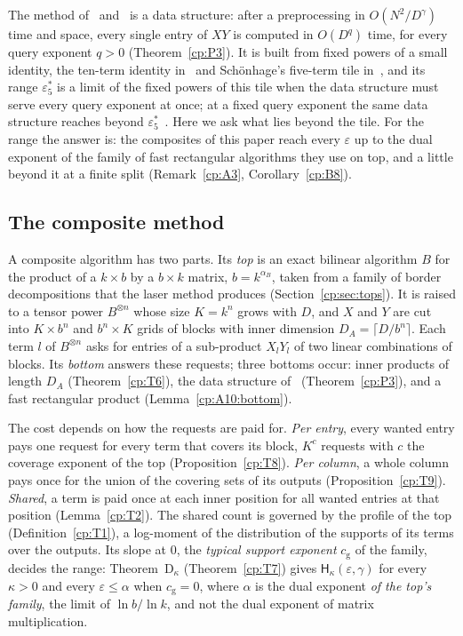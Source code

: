 \documentclass[11pt]{article}
\makeatletter
\theoremstyle{definition}
\theoremstyle{remark}
\DeclareRobustCommand{\CPTODO}[1]{{\color{red}\textbf{[CP-TODO:} #1\textbf{]}}}
\providecommand{\eps}{\varepsilon}
\newcommand{\Hypk}[1]{\mathsf{H}_{#1}}        %
\newcommand{\es}{\varepsilon^*_5}             %
\newcommand{\alB}{\alpha_B}                   %
\newcommand{\cg}{c_{\mathrm g}}               %
\newcommand{\ThmDk}{Theorem~D\texorpdfstring{\ensuremath{_\kappa}}{\_kappa}}     %
\newcommand{\Vref}[1]{\ifcsname vtworef@#1\endcsname\csname vtworef@#1\endcsname\else\CPTODO{label #1 of the other paper undefined}\fi}
\makeatother
\begin{document}
The method of~\cite{AV26} and~\cite{v2} is a data structure: after a preprocessing in $O(N^2/D^{\gamma})$ time and space, every single entry of $XY$ is computed in $O(D^q)$ time, for every query exponent $q>0$ (Theorem~\ref{cp:P3}). It is built from fixed powers of a small identity, the ten-term identity in~\cite{AV26} and Schönhage's five-term tile in~\cite{v2}, and its range $\es$ is a limit of the fixed powers of this tile when the data structure must serve every query exponent at once; at a fixed query exponent the same data structure reaches beyond $\es$~\cite[Theorem~\Vref{m:thm:fixedq}]{v2}. Here we ask what lies beyond the tile. For the range the answer is: the composites of this paper reach every $\eps$ up to the dual exponent of the family of fast rectangular algorithms they use on top, and a little beyond it at a finite split (Remark~\ref{cp:A3}, Corollary~\ref{cp:B8}).

\subsection{The composite method}\label{cp:sec:intro:method}

A composite algorithm has two parts. Its \emph{top} is an exact bilinear algorithm $B$ for the product of a $k\times b$ by a $b\times k$ matrix, $b=k^{\alB}$, taken from a family of border decompositions that the laser method produces (Section~\ref{cp:sec:tops}). It is raised to a tensor power $B^{\otimes n}$ whose size $K=k^n$ grows with $D$, and $X$ and $Y$ are cut into $K\times b^n$ and $b^n\times K$ grids of blocks with inner dimension $D_A=\lceil D/b^n\rceil$. Each term $l$ of $B^{\otimes n}$ asks for entries of a sub-product $X_lY_l$ of two linear combinations of blocks. Its \emph{bottom} answers these requests; three bottoms occur: inner products of length $D_A$ (Theorem~\ref{cp:T6}), the data structure of~\cite{v2} (Theorem~\ref{cp:P3}), and a fast rectangular product (Lemma~\ref{cp:A10:bottom}).

The cost depends on how the requests are paid for. \emph{Per entry}, every wanted entry pays one request for every term that covers its block, $K^{c}$ requests with $c$ the coverage exponent of the top (Proposition~\ref{cp:T8}). \emph{Per column}, a whole column pays once for the union of the covering sets of its outputs (Proposition~\ref{cp:T9}). \emph{Shared}, a term is paid once at each inner position for all wanted entries at that position (Lemma~\ref{cp:T2}). The shared count is governed by the profile of the top (Definition~\ref{cp:T1}), a log-moment of the distribution of the supports of its terms over the outputs. Its slope at $0$, the \emph{typical support exponent} $\cg$ of the family, decides the range: \ThmDk{} (Theorem~\ref{cp:T7}) gives $\Hypk\kappa(\eps,\gamma)$ for every $\kappa>0$ and every $\eps\le\alpha$ when $\cg=0$, where $\alpha$ is the dual exponent \emph{of the top's family}, the limit of $\ln b/\ln k$, and not the dual exponent of matrix multiplication.
\end{document}
